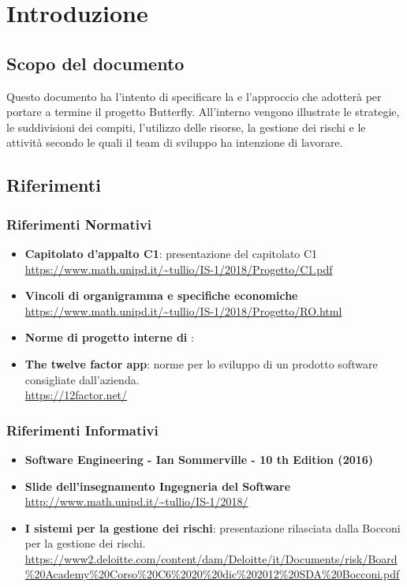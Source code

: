 \newpage
\section{Introduzione} \label{Introduzione}
	
	\subsection{Scopo del documento}
	Questo documento ha l'intento di specificare la  e l'approccio che \gruppo adotterà per portare a termine il progetto Butterfly.
	All'interno vengono illustrate le strategie, le suddivisioni dei compiti, l'utilizzo delle risorse, la gestione dei rischi e le attività secondo le quali il team di sviluppo ha intenzione di lavorare.
	
	
    

	
	\subsection{Riferimenti}
		\subsubsection{Riferimenti Normativi}
			\begin{itemize}
				\item \textbf{Capitolato d'appalto C1}: presentazione del capitolato C1\\
				\url{https://www.math.unipd.it/~tullio/IS-1/2018/Progetto/C1.pdf}
				\item \textbf{Vincoli di organigramma e specifiche economiche}\\
				\url{https://www.math.unipd.it/~tullio/IS-1/2018/Progetto/RO.html}
				\item \textbf{Norme di progetto interne di \gruppo}: \NdPv
				\item \textbf{The twelve factor app}: norme per lo sviluppo di un prodotto software consigliate dall'azienda.\\
				\url{https://12factor.net/}
			\end{itemize}
		
		\subsubsection{Riferimenti Informativi}
			\begin{itemize}
				\item \textbf{Software Engineering - Ian Sommerville - 10 th Edition (2016)}
				\item \textbf{Slide dell’insegnamento Ingegneria del Software}\\
				\url{http://www.math.unipd.it/~tullio/IS-1/2018/}
				\item \textbf{I sistemi per la gestione dei rischi}: presentazione rilasciata dalla Bocconi per la gestione dei rischi.\\
				\url{https://www2.deloitte.com/content/dam/Deloitte/it/Documents/risk/Board\%20Academy\%20Corso\%20C6\%2020\%20dic\%202012\%20SDA\%20Bocconi.pdf}
			\end{itemize}
		

